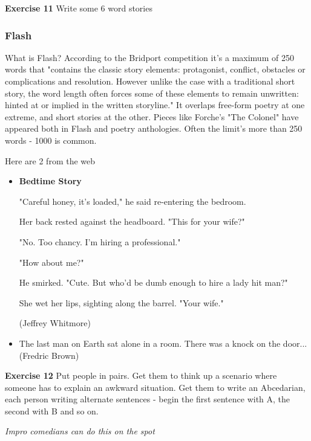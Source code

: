 \documentclass[11pt]{article}
\newenvironment{narrow}[2]{%
 \begin{list}{}{%
  \setlength{\topsep}{0pt}%
  \setlength{\leftmargin}{#1}%
  \setlength{\rightmargin}{#2}%
  \setlength{\listparindent}{\parindent}%
  \setlength{\itemindent}{\parindent}%
  \setlength{\parsep}{\parskip}%
 }%
\item[]}{\end{list}}
\begin{document}
\begin{narrow}{1.0cm}{1.0cm}
\textbf{Exercise 11} Write some 6 word stories
\end{narrow}
\subsubsection*{Flash}

What is Flash? According to the Bridport competition it's a maximum of 250 words that "contains the classic story elements:
protagonist, conflict, obstacles or complications and
resolution. However unlike the case with a traditional short story,
the word length often forces some of these elements to remain
unwritten: hinted at or implied in the written storyline." It overlaps free-form poetry at one extreme, and short stories at the other. Pieces like Forche's "The Colonel" have appeared both in Flash and poetry anthologies. Often the limit's more than 250 words - 1000 is common.



Here are 2 from the web



\begin{itemize}
\item \textbf{Bedtime Story}

"Careful honey, it's loaded," he said re-entering the bedroom.

Her back rested against the headboard. "This for your wife?"

"No. Too chancy. I'm hiring a professional."

"How about me?"

He smirked. "Cute. But who'd be dumb enough to hire a lady hit man?"

She wet her lips, sighting along the barrel. "Your wife." 

(Jeffrey Whitmore)

\item The last man on Earth sat alone in a room. There was a knock on the door... (Fredric Brown)
\end{itemize}

\begin{narrow}{1.0cm}{1.0cm}
\textbf{Exercise 12} Put people in pairs. Get them to think up a scenario where someone has 
to explain an awkward situation. Get them to write an Abcedarian, each person 
writing alternate sentences - begin the first sentence with A, the second with 
B and so on.
\end{narrow}
\textit{Impro comedians can do this on the spot}
\end{document}
